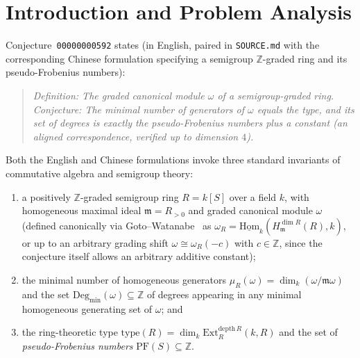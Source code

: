 \documentclass[11pt]{article}
\theoremstyle{definition}
\theoremstyle{remark}
\begin{document}
\section{Introduction and Problem Analysis}

Conjecture~\texttt{00000000592} states (in English, paired in \texttt{SOURCE.md} with the corresponding Chinese formulation specifying a semigroup $\mathbb{Z}$-graded ring and its pseudo-Frobenius numbers):

\begin{quote}
\emph{Definition: The graded canonical module $\omega$ of a semigroup-graded ring. Conjecture: The minimal number of generators of $\omega$ equals the type, and its set of degrees is exactly the pseudo-Frobenius numbers plus a constant (an aligned correspondence, verified up to dimension $4$).}
\end{quote}

Both the English and Chinese formulations invoke three standard invariants of commutative algebra and semigroup theory:
\begin{enumerate}
  \item[(i)] a positively $\mathbb{Z}$-graded semigroup ring $R = k[S]$ over a field $k$, with homogeneous maximal ideal $\mathfrak{m} = R_{>0}$ and graded canonical module $\omega$ (defined canonically via Goto--Watanabe~\cite{GW1,GW2} as $\omega_R = \underline{\mathrm{Hom}}_k(H^{\dim R}_{\mathfrak{m}}(R), k)$, or up to an arbitrary grading shift $\omega \cong \omega_R(-c)$ with $c \in \mathbb{Z}$, since the conjecture itself allows an arbitrary additive constant);
  \item[(ii)] the minimal number of homogeneous generators $\mu_R(\omega) = \dim_k(\omega / \mathfrak{m}\omega)$ and the set $\mathrm{Deg}_{\min}(\omega) \subseteq \mathbb{Z}$ of degrees appearing in any minimal homogeneous generating set of $\omega$; and
  \item[(iii)] the ring-theoretic type $\mathrm{type}(R) = \dim_k \mathrm{Ext}^{\mathrm{depth}\, R}_R(k, R)$ and the set of \emph{pseudo-Frobenius numbers} $\mathrm{PF}(S) \subseteq \mathbb{Z}$.
\end{enumerate}
\end{document}
